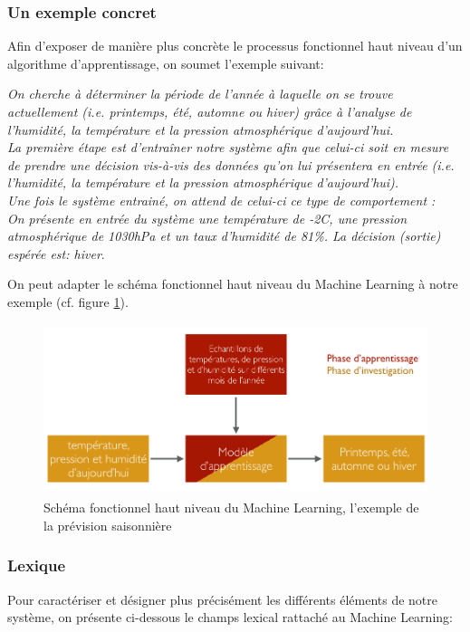 \subsubsection{Un exemple concret}
\label{Le Machine Learning: Généralités sur le Machine Learning: Définition et principe général:un exemple concret}
Afin d'exposer de manière plus concrète le processus fonctionnel haut niveau d'un algorithme d'apprentissage, on soumet l'exemple suivant:

\textit{On cherche à déterminer la période de l'année à laquelle on se trouve actuellement (i.e. printemps, été, automne ou hiver) grâce à l'analyse de l'humidité, la température et la pression atmosphérique d'aujourd'hui. \\
	La première étape est d'entraîner notre système afin que celui-ci soit en mesure de prendre une décision vis-à-vis des données qu'on lui présentera en entrée (i.e. l'humidité, la température et la pression atmosphérique d'aujourd'hui). \\
	Une fois le système entrainé, on attend de celui-ci ce type de comportement : \\
	On présente en entrée du système une température de -2\degres C, une pression atmosphérique de 1030hPa et un taux d'humidité de 81\%. La décision (sortie) espérée est: \emph{hiver}}.

On peut adapter le schéma fonctionnel haut niveau du Machine Learning à notre exemple (cf. figure \ref{fig:Schéma fonctionnel haut niveau du Machine Learning, l'exemple prévision saisonnière}).

\begin{figure}[h]
	\centering\includegraphics[height=5cm]{images/ML_high_level_expl.png}
	\caption{Schéma fonctionnel haut niveau du Machine Learning, l'exemple de la prévision saisonnière}
	\label{fig:Schéma fonctionnel haut niveau du Machine Learning, l'exemple prévision saisonnière}
\end{figure}

\subsubsection{Lexique} 
\label{Le Machine Learning: Généralités sur le Machine Learning: Définition et principe général:Lexique}
Pour caractériser et  désigner plus précisément les différents éléments de notre système, on présente ci-dessous le champs lexical rattaché au Machine Learning:

